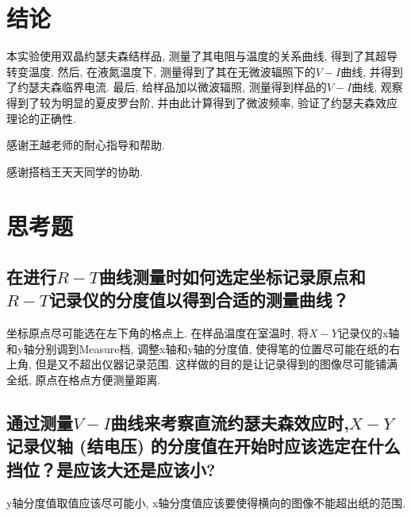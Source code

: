 \documentclass[font=default]{mpltx}
\newcommand{\note}[1]{{\color{gray}#1}}
\newcommand*\env[1]{\textit{\texttt{#1}}}
\begin{document}

\section{结论}
本实验使用双晶约瑟夫森结样品, 测量了其电阻与温度的关系曲线, 得到了其超导转变温度. 然后, 在液氮温度下, 测量得到了其在无微波辐照下的$V-I$曲线,
并得到了约瑟夫森临界电流. 最后, 给样品加以微波辐照, 测量得到样品的$V-I$曲线, 观察得到了较为明显的夏皮罗台阶, 并由此计算得到了微波频率, 验证了约瑟夫森效应理论的正确性.


\begin{acknowledgments}
  感谢王越老师的耐心指导和帮助.
  \par
  感谢搭档王天天同学的协助.
\end{acknowledgments}



\clearpage %
\appendix %
\section{思考题}\label{app:exercise}
\subsection{在进行$R-T$曲线测量时如何选定坐标记录原点和$R-T$记录仪的分度值以得到合适的测量曲线？}
坐标原点尽可能选在左下角的格点上. 在样品温度在室温时, 将$X-Y$记录仪的x轴和y轴分别调到Measure档, 调整x轴和y轴的分度值, 使得笔的位置尽可能在纸的右上角, 但是又不超出仪器记录范围.
这样做的目的是让记录得到的图像尽可能铺满全纸, 原点在格点方便测量距离.
\subsection{通过测量$V-I$曲线来考察直流约瑟夫森效应时,$X-Y$记录仪轴 (结电压) 的分度值在开始时应该选定在什么挡位？是应该大还是应该小? }
y轴分度值取值应该尽可能小, x轴分度值应该要使得横向的图像不能超出纸的范围. 
\end{document}
